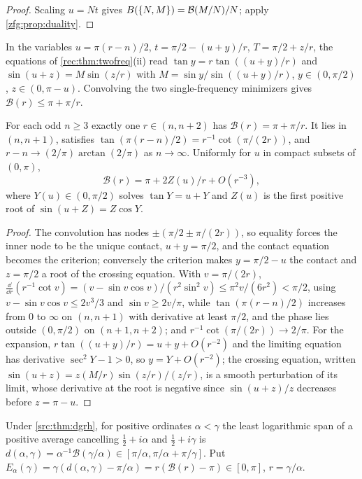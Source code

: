 \begin{proof}
Scaling $u=Nt$ gives $B(\{N,M\})=\mathcal B(M/N)/N$; apply \cref{zfg:prop:duality}.
\end{proof}

In the variables $u=\pi(r-n)/2$, $t=\pi/2-(u+y)/r$, $T=\pi/2+z/r$, the equations of \cref{rec:thm:twofreq}(ii) read
$\tan y=r\tan((u+y)/r)$ and $\sin(u+z)=M\sin(z/r)$ with $M=\sin y/\sin((u+y)/r)$, $y\in(0,\pi/2)$, $z\in(0,\pi-u)$. Convolving the
two single-frequency minimizers gives $\mathcal B(r)\le\pi+\pi/r$.

\begin{theorem}\label{rec:thm:twosat}
For each odd $n\ge3$ exactly one $r\in(n,n+2)$ has $\mathcal B(r)=\pi+\pi/r$. It lies in $(n,n+1)$, satisfies
$\tan(\pi(r-n)/2)=r^{-1}\cot(\pi/(2r))$, and $r-n\to(2/\pi)\arctan(2/\pi)$ as $n\to\infty$. Uniformly for $u$ in compact subsets of $(0,\pi)$,
\[
 \mathcal B(r)=\pi+2Z(u)/r+O(r^{-3}),
\]
where $Y(u)\in(0,\pi/2)$ solves $\tan Y=u+Y$ and $Z(u)$ is the first positive root of $\sin(u+Z)=Z\cos Y$.
\end{theorem}

\begin{proof}
The convolution has nodes $\pm(\pi/2\pm\pi/(2r))$, so equality forces the inner node to be the unique contact,
$u+y=\pi/2$, and the contact equation becomes the criterion; conversely the criterion makes $y=\pi/2-u$ the
contact and $z=\pi/2$ a root of the crossing equation. With $v=\pi/(2r)$, $\frac{\dd}{\dd r}(r^{-1}\cot v)=(v-\sin v\cos v)/(r^2\sin^2v)\le\pi^2v/(6r^2)<\pi/2$,
using $v-\sin v\cos v\le2v^3/3$ and $\sin v\ge2v/\pi$, while $\tan(\pi(r-n)/2)$ increases from $0$ to $\infty$ on $(n,n+1)$ with
derivative at least $\pi/2$, and the phase lies outside $(0,\pi/2)$ on $(n+1,n+2)$; and $r^{-1}\cot(\pi/(2r))\to2/\pi$. For the
expansion, $r\tan((u+y)/r)=u+y+O(r^{-2})$ and the limiting equation has derivative $\sec^2Y-1>0$, so $y=Y+O(r^{-2})$;
the crossing equation, written $\sin(u+z)=z(M/r)\sin(z/r)/(z/r)$, is a smooth perturbation of its limit, whose
derivative at the root is negative since $\sin(u+z)/z$ decreases before $z=\pi-u$.
\end{proof}

Under \cref{src:thm:dgrh}, for positive ordinates $\alpha<\gamma$ the least logarithmic span of a positive average
cancelling $\tfrac12+i\alpha$ and $\tfrac12+i\gamma$ is $d(\alpha,\gamma)=\alpha^{-1}\mathcal B(\gamma/\alpha)\in[\pi/\alpha,\pi/\alpha+\pi/\gamma]$. Put
$E_\alpha(\gamma)=\gamma(d(\alpha,\gamma)-\pi/\alpha)=r(\mathcal B(r)-\pi)\in[0,\pi]$, $r=\gamma/\alpha$.

